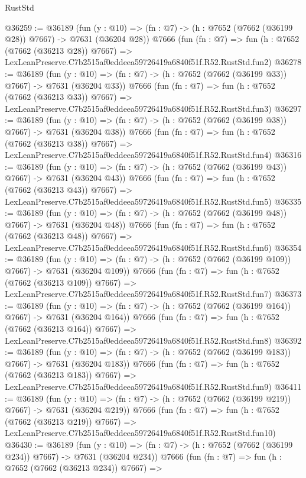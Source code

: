 \begin{lexlean}{RustStd}
\begin{coremodule}
@36259 := @36189
    (fun (y : @10) => (fn : @7) -> (h : @7652 (@7662 (@36199 @28)) @7667) -> @7631 (@36204 @28))
    @7666
    (fun (fn : @7) =>
    fun (h : @7652 (@7662 (@36213 @28)) @7667) =>
    LexLeanPreserve.C7b2515af0eddeea59726419a6840f51f.R52.RustStd.fun2)
@36278 := @36189
    (fun (y : @10) => (fn : @7) -> (h : @7652 (@7662 (@36199 @33)) @7667) -> @7631 (@36204 @33))
    @7666
    (fun (fn : @7) =>
    fun (h : @7652 (@7662 (@36213 @33)) @7667) =>
    LexLeanPreserve.C7b2515af0eddeea59726419a6840f51f.R52.RustStd.fun3)
@36297 := @36189
    (fun (y : @10) => (fn : @7) -> (h : @7652 (@7662 (@36199 @38)) @7667) -> @7631 (@36204 @38))
    @7666
    (fun (fn : @7) =>
    fun (h : @7652 (@7662 (@36213 @38)) @7667) =>
    LexLeanPreserve.C7b2515af0eddeea59726419a6840f51f.R52.RustStd.fun4)
@36316 := @36189
    (fun (y : @10) => (fn : @7) -> (h : @7652 (@7662 (@36199 @43)) @7667) -> @7631 (@36204 @43))
    @7666
    (fun (fn : @7) =>
    fun (h : @7652 (@7662 (@36213 @43)) @7667) =>
    LexLeanPreserve.C7b2515af0eddeea59726419a6840f51f.R52.RustStd.fun5)
@36335 := @36189
    (fun (y : @10) => (fn : @7) -> (h : @7652 (@7662 (@36199 @48)) @7667) -> @7631 (@36204 @48))
    @7666
    (fun (fn : @7) =>
    fun (h : @7652 (@7662 (@36213 @48)) @7667) =>
    LexLeanPreserve.C7b2515af0eddeea59726419a6840f51f.R52.RustStd.fun6)
@36354 := @36189
    (fun (y : @10) => (fn : @7) -> (h : @7652 (@7662 (@36199 @109)) @7667) -> @7631 (@36204 @109))
    @7666
    (fun (fn : @7) =>
    fun (h : @7652 (@7662 (@36213 @109)) @7667) =>
    LexLeanPreserve.C7b2515af0eddeea59726419a6840f51f.R52.RustStd.fun7)
@36373 := @36189
    (fun (y : @10) => (fn : @7) -> (h : @7652 (@7662 (@36199 @164)) @7667) -> @7631 (@36204 @164))
    @7666
    (fun (fn : @7) =>
    fun (h : @7652 (@7662 (@36213 @164)) @7667) =>
    LexLeanPreserve.C7b2515af0eddeea59726419a6840f51f.R52.RustStd.fun8)
@36392 := @36189
    (fun (y : @10) => (fn : @7) -> (h : @7652 (@7662 (@36199 @183)) @7667) -> @7631 (@36204 @183))
    @7666
    (fun (fn : @7) =>
    fun (h : @7652 (@7662 (@36213 @183)) @7667) =>
    LexLeanPreserve.C7b2515af0eddeea59726419a6840f51f.R52.RustStd.fun9)
@36411 := @36189
    (fun (y : @10) => (fn : @7) -> (h : @7652 (@7662 (@36199 @219)) @7667) -> @7631 (@36204 @219))
    @7666
    (fun (fn : @7) =>
    fun (h : @7652 (@7662 (@36213 @219)) @7667) =>
    LexLeanPreserve.C7b2515af0eddeea59726419a6840f51f.R52.RustStd.fun10)
@36430 := @36189
    (fun (y : @10) => (fn : @7) -> (h : @7652 (@7662 (@36199 @234)) @7667) -> @7631 (@36204 @234))
    @7666
    (fun (fn : @7) =>
    fun (h : @7652 (@7662 (@36213 @234)) @7667) =>

\end{coremodule}
\end{lexlean}
